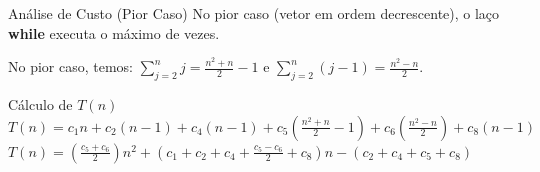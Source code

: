 \documentclass[9pt]{beamer}
\begin{document}
\begin{frame}{Análise de Custo (Pior Caso)}
    No pior caso (vetor em ordem decrescente), o laço \textbf{while} executa o máximo de vezes.
    \vspace{0.2cm}
    \begin{center}
    \end{center}
    \vspace{0.1cm}
    No pior caso, temos: $\sum_{j=2}^n j = \frac{n^2+n}{2}-1$ e $\sum_{j=2}^n (j-1) = \frac{n^2-n}{2}$.
    \begin{block}{Cálculo de $T(n)$}
        \small
        $T(n) = c_1 n + c_2(n-1) + c_4(n-1) + c_5(\frac{n^2+n}{2}-1) + c_6(\frac{n^2-n}{2}) + c_8(n-1)$ \\
        $T(n) = \left( \frac{c_5+c_6}{2} \right)n^2 + \left( c_1+c_2+c_4+\frac{c_5-c_6}{2}+c_8 \right)n - (c_2+c_4+c_5+c_8)$
    \end{block}
\end{frame}
\end{document}
